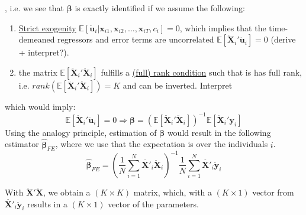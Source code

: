 , i.e. we see that $\pmb{\beta}$ is exactly identified if we assume the following:
\begin{enumerate}
    \item \underline{Strict exogenity} $\mathbb{E}[\pmb{\ddot{u}}_{i}\vert \pmb{x}_{i1},\pmb{x}_{i2},\dots,\pmb{x}_{iT},c_i]=0$, which implies that the time-demeaned regressors and error terms are uncorrelated $\mathbb{E}[\pmb{\ddot{X}}_{i}' \pmb{\ddot{u}}_{i}]=0$ (derive + interpret?). 
    \item the matrix $\mathbb{E}[\pmb{\ddot{X}}_{i}'\pmb{\ddot{X}}_{i}]$ fulfills a \underline{ (full) rank condition} such that is has full rank, i.e. $rank(\mathbb{E}[\pmb{\ddot{X}}_{i}'\pmb{\ddot{X}}_{i}])=K$ and can be inverted. Interpret
\end{enumerate}
which would imply:
$$\mathbb{E}[\pmb{\ddot{X}}_{i}' \pmb{\ddot{u}}_{i}]= 0\Rightarrow \pmb{\beta} = (\mathbb{E}[\pmb{\ddot{X}}_{i}'\pmb{\ddot{X}}_{i}])^{-1} \mathbb{E}[\pmb{\ddot{X}}_{i}'\pmb{y}_{i}]$$
Using the analogy principle, estimation of $\pmb{\beta}$ would result in the following estimator $\pmb{\hat{\beta}}_{FE}$, where we use that the expectation is over the individuals $i$.
$$\pmb{\hat{\beta}}_{FE}= \left( \frac{1}{N} \sum_{i=1}^N {\pmb{\ddot{X'}}_{i} \pmb{\ddot{X}}_{i} } \right) ^{-1}\frac{1}{N} \sum_{i=1}^N {\pmb{\ddot{X'}}_{i} \pmb{\ddot{y}}_{i} }$$

With $\pmb{\ddot{X}}'\pmb{\ddot{X}}$, we obtain a $(K \times K)$ matrix, which, with a $(K \times 1)$ vector from $\pmb{\ddot{X'}}_{i} \pmb{\ddot{y}}_{i}$ results in a $(K \times 1)$ vector of the parameters.

